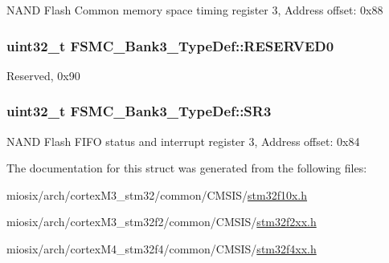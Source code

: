 N\-A\-N\-D Flash Common memory space timing register 3, Address offset\-: 0x88 \hypertarget{struct_f_s_m_c___bank3___type_def_a2e9cac528ee7bfce11b0b9a36db3b954}{
\subsubsection[{R\-E\-S\-E\-R\-V\-E\-D0}]{\setlength{\rightskip}{0pt plus 5cm}uint32\-\_\-t F\-S\-M\-C\-\_\-\-Bank3\-\_\-\-Type\-Def\-::\-R\-E\-S\-E\-R\-V\-E\-D0}}\label{struct_f_s_m_c___bank3___type_def_a2e9cac528ee7bfce11b0b9a36db3b954}
Reserved, 0x90 \hypertarget{struct_f_s_m_c___bank3___type_def_ab89f16f64018a1f1e55d36f92b84be94}{
\subsubsection[{S\-R3}]{ uint32\-\_\-t F\-S\-M\-C\-\_\-\-Bank3\-\_\-\-Type\-Def\-::\-S\-R3}}\label{struct_f_s_m_c___bank3___type_def_ab89f16f64018a1f1e55d36f92b84be94}
N\-A\-N\-D Flash F\-I\-F\-O status and interrupt register 3, Address offset\-: 0x84 

The documentation for this struct was generated from the following files\-:\begin{DoxyCompactItemize}
\item 
miosix/arch/cortex\-M3\-\_\-stm32/common/\-C\-M\-S\-I\-S/\hyperlink{stm32f10x_8h}{stm32f10x.\-h}\item 
miosix/arch/cortex\-M3\-\_\-stm32f2/common/\-C\-M\-S\-I\-S/\hyperlink{stm32f2xx_8h}{stm32f2xx.\-h}\item 
miosix/arch/cortex\-M4\-\_\-stm32f4/common/\-C\-M\-S\-I\-S/\hyperlink{stm32f4xx_8h}{stm32f4xx.\-h}\end{DoxyCompactItemize}

